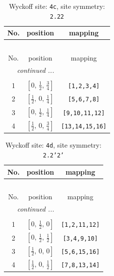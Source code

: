 \documentclass[fleqn,8pt]{jsarticle}
\begin{document}
\renewcommand{\arraystretch}{1.2}
\begin{longtable}{ccc}
\caption{Wyckoff site: {\tt 4c}, site symmetry: {\tt 2.22}}
 \\
 \hline \hline
No. & position & mapping \\ \hline \endfirsthead

\multicolumn{2}{l}{\tablename\ \thetable{}} \\
 \hline \hline
No. & position & mapping \\ \hline \endhead

 \hline \hline
\multicolumn{2}{r}{\footnotesize\it continued ...} \\ \endfoot

 \hline \hline
\multicolumn{2}{r}{} \\ \endlastfoot

1 & $\left[ 0,\, \frac{1}{2},\, \frac{3}{4} \right]$ & {\tt [1,2,3,4]} \\ \hline
2 & $\left[ \frac{1}{2},\, 0,\, \frac{1}{4} \right]$ & {\tt [5,6,7,8]} \\ \hline
3 & $\left[ 0,\, \frac{1}{2},\, \frac{1}{4} \right]$ & {\tt [9,10,11,12]} \\ \hline
4 & $\left[ \frac{1}{2},\, 0,\, \frac{3}{4} \right]$ & {\tt [13,14,15,16]} \\
\end{longtable}
\renewcommand{\arraystretch}{1.2}
\begin{longtable}{ccc}
\caption{Wyckoff site: {\tt 4d}, site symmetry: {\tt 2.2'2'}}
 \\
 \hline \hline
No. & position & mapping \\ \hline \endfirsthead

\multicolumn{2}{l}{\tablename\ \thetable{}} \\
 \hline \hline
No. & position & mapping \\ \hline \endhead

 \hline \hline
\multicolumn{2}{r}{\footnotesize\it continued ...} \\ \endfoot

 \hline \hline
\multicolumn{2}{r}{} \\ \endlastfoot

1 & $\left[ 0,\, \frac{1}{2},\, 0 \right]$ & {\tt [1,2,11,12]} \\ \hline
2 & $\left[ 0,\, \frac{1}{2},\, \frac{1}{2} \right]$ & {\tt [3,4,9,10]} \\ \hline
3 & $\left[ \frac{1}{2},\, 0,\, 0 \right]$ & {\tt [5,6,15,16]} \\ \hline
4 & $\left[ \frac{1}{2},\, 0,\, \frac{1}{2} \right]$ & {\tt [7,8,13,14]} \\
\end{longtable}
\end{document}
